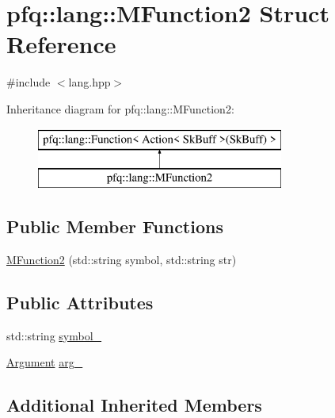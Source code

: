 \hypertarget{structpfq_1_1lang_1_1MFunction2}{\section{pfq\+:\+:lang\+:\+:M\+Function2 Struct Reference}
\label{structpfq_1_1lang_1_1MFunction2}
}


{\ttfamily \#include $<$lang.\+hpp$>$}

Inheritance diagram for pfq\+:\+:lang\+:\+:M\+Function2\+:\begin{figure}[H]
\begin{center}
\leavevmode
\includegraphics[height=2.000000cm]{structpfq_1_1lang_1_1MFunction2}
\end{center}
\end{figure}
\subsection*{Public Member Functions}
\begin{DoxyCompactItemize}
\item 
\hyperlink{structpfq_1_1lang_1_1MFunction2_adfa8a825221d088bfc4a938ce491098b}{M\+Function2} (std\+::string symbol, std\+::string str)
\end{DoxyCompactItemize}
\subsection*{Public Attributes}
\begin{DoxyCompactItemize}
\item 
std\+::string \hyperlink{structpfq_1_1lang_1_1MFunction2_afdd71c7aed6b8f5f801bfd6c98f7274d}{symbol\+\_\+}
\item 
\hyperlink{structpfq_1_1lang_1_1Argument}{Argument} \hyperlink{structpfq_1_1lang_1_1MFunction2_a785a0845ac0b184e1e31711d920ebe50}{arg\+\_\+}
\end{DoxyCompactItemize}
\subsection*{Additional Inherited Members}



